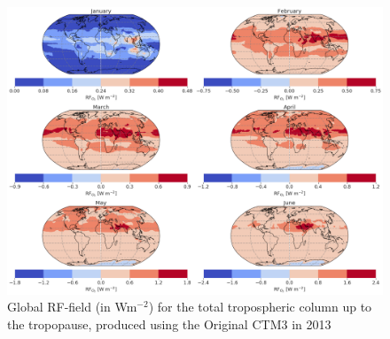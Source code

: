 \begin{figure}[ht]
    \centering
    \includegraphics[width = \linewidth]{Chapter6_Results/images/RF/RF_USE/Appendix/Orig_RF_global_2013.png}
    \caption{Global RF-field (in Wm$^{-2}$) for the total tropospheric column up to the tropopause, produced using the Original CTM3 in 2013}
    \label{fig:orig_RF_global_2013}
\end{figure}